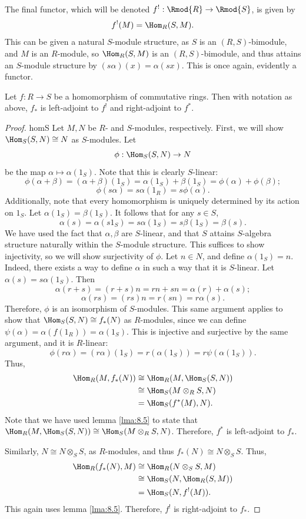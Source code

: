 The final functor, which will be denoted $f^!: \Rmod{R}  \to \Rmod{S} $, is given by
\[
	f^!(M)=\Hom_{R}(S, M) 
.\]
This can be given a natural $S$-module structure, as $S$ is an $(R,S)$-bimodule, and $M$ is an $R$-module, so $\Hom_{R}(S, M) $ is an $(R,S)$-bimodule, and thus attains an $S$-module structure by $(s\alpha )(x)=\alpha (sx)$. This is once again, evidently a functor.

\begin{proposition}\label{prp:8.10}
	Let $f : R \to S$ be a homomorphism of commutative rings. Then with notation as above, $f_*$ is left-adjoint to $f^!$ and right-adjoint to $f^*$.
\end{proposition}
\begin{proof}homS
	Let $M,N$ be $R$- and $S$-modules, respectively. First, we will show $\Hom_{S}(S, N) \cong N$ as $S$-modules. Let
	\[
		\phi : \Hom_{S}(S, N)  \to N
\]
be the map $\alpha \mapsto \alpha (1_S)$. Note that this is clearly $S$-linear:
\[
	\phi (\alpha +\beta )=(\alpha +\beta )(1_S)=\alpha (1_S)+\beta (1_S)=\phi (\alpha )+\phi (\beta )
;\]
\[
	\phi (s\alpha )=s\alpha (1_R)=s\phi (\alpha )
.\]
Additionally, note that every homomorphism is uniquely determined by its action on $1_S$. Let $\alpha (1_S)=\beta (1_S)$. It follows that for any $s\in S$,
\[
	\alpha (s)=\alpha (s1_S)=s\alpha (1_S)=s\beta (1_S)=\beta (s)
.\]
We have used the fact that $\alpha ,\beta $ are $S$-linear, and that $S$ attains $S$-algebra structure naturally within the $S$-module structure. This suffices to show injectivity, so we will show surjectivity of $\phi $. Let $n\in N$, and define $\alpha (1_S)=n$. Indeed, there exists a way to define $\alpha $ in such a way that it is $S$-linear. Let $\alpha (s)=s\alpha (1_S)$. Then
\[
	\alpha (r+s)=(r+s)n=rn+sn=\alpha (r)+\alpha (s);
\]
\[
	\alpha (rs)=(rs)n=r(sn)=r\alpha (s)
.\]
Therefore, $\phi $ is an isomorphism of $S$-modules. This same argument applies to show that $\Hom_{S}(S, N) \cong f_*(N)$ as $R$-modules, since we can define $\psi (\alpha )=\alpha (f(1_R))=\alpha (1_S)$. This is injective and surjective by the same argument, and it is $R$-linear:
\[
	\phi (r\alpha )=(r\alpha )(1_S)=r(\alpha (1_S))=r\psi (\alpha (1_S))
.\]
Thus,
\begin{align*}
	\Hom_{R}(M, f_*(N)) &\cong \Hom_{R}(M, \Hom_{S}(S, N) ) \\
			    &\cong \Hom_{S}(M\otimes_R S, N) \\
			    &=\Hom_{S}(f^*(M), N) 
.\end{align*}
Note that we have used lemma \ref{lma:8.5} to state that $\Hom_{R}(M, \Hom_{S}(S, N) ) \cong \Hom_{S}(M\otimes _RS, N) $. Therefore, $f^*$ is left-adjoint to $f_*$.

Similarly, $N\cong N\otimes_S S$, as $R$-modules, and thus $f_*(N)\cong N\otimes_SS$. Thus,
\begin{align*}
	\Hom_{R}(f_*(N), M) &\cong \Hom_{R}(N\otimes _SS, M) \\
			    &\cong \Hom_{S}(N, \Hom_{R}(S, M) ) \\
			    &=\Hom_{S}(N, f^!(M)) 
.\end{align*}
This again uses lemma \ref{lma:8.5}. Therefore, $f^!$ is right-adjoint to $f_*$.
\end{proof}
